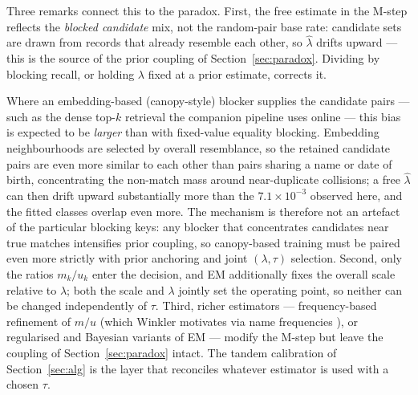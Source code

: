 \documentclass[11pt]{article}
\begin{document}
Three remarks connect this to the paradox. First, the free estimate in the M-step reflects
the \emph{blocked candidate} mix, not the random-pair base rate: candidate sets are drawn
from records that already resemble each other, so $\hat\lambda$ drifts upward --- this is the
source of the prior coupling of Section~\ref{sec:paradox}. Dividing by blocking recall, or
holding $\lambda$ fixed at a prior estimate, corrects it.

Where an embedding-based (canopy-style) blocker supplies the candidate pairs --- such as the
dense top-$k$ retrieval the companion pipeline uses online \cite{pipeline} --- this bias is
expected to be \emph{larger} than with fixed-value equality blocking. Embedding
neighbourhoods are selected by overall resemblance, so the retained candidate pairs are even
more similar to each other than pairs sharing a name or date of birth, concentrating the
non-match mass around near-duplicate collisions; a free $\hat\lambda$ can then drift upward
substantially more than the $7.1\times10^{-3}$ observed here, and the fitted classes overlap
even more. The mechanism is therefore not an artefact of the particular blocking keys: any
blocker that concentrates candidates near true matches intensifies prior coupling, so
canopy-based training must be paired even more strictly with prior anchoring and joint
$(\lambda,\tau)$ selection. Second, only the ratios $m_k/u_k$
enter the decision, and EM additionally fixes the overall scale relative to $\lambda$; both
the scale and $\lambda$ jointly set the operating point, so neither can be changed
independently of $\tau$. Third, richer estimators --- frequency-based refinement of $m/u$
(which Winkler motivates via name frequencies \cite{winkler2000}), or regularised and
Bayesian variants of EM --- modify the M-step but leave the coupling of
Section~\ref{sec:paradox} intact. The tandem calibration of Section~\ref{sec:alg} is the
layer that reconciles whatever estimator is used with a chosen $\tau$.
\end{document}
